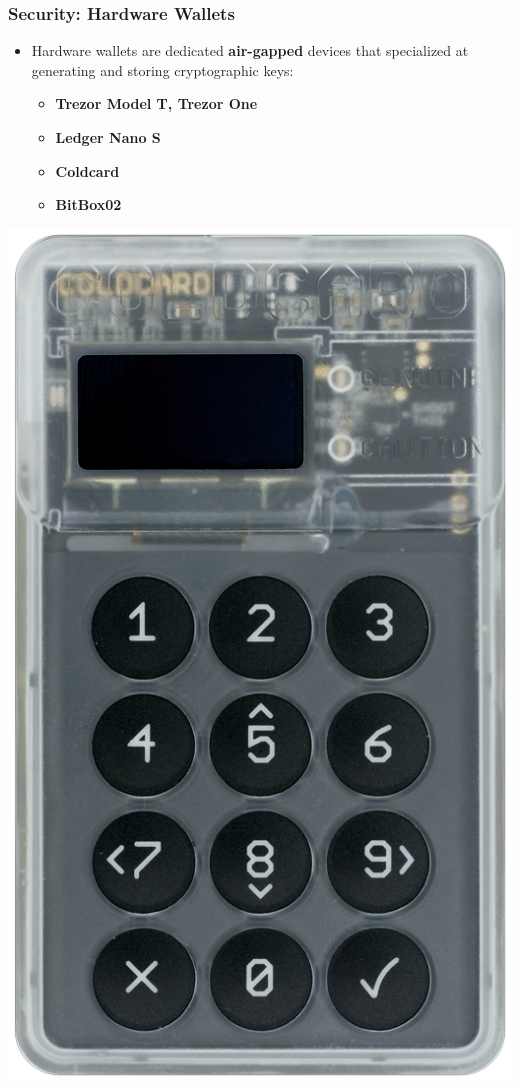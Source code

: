 \documentclass{beamer}
\begin{document}
\begin{frame}[fragile]
  \frametitle{Security: Hardware Wallets}
  \begin{minipage}{0.6\textwidth}\raggedright
    \begin{itemize}
    \item Hardware wallets are dedicated \textbf{air-gapped} devices that
      specialized at generating and storing cryptographic keys:
      \begin{itemize}
      \item \textbf{Trezor Model T, Trezor One}
      \item \textbf{Ledger Nano S}
      \item \textbf{Coldcard}
      \item \textbf{BitBox02}
      \end{itemize}
    \end{itemize}
  \end{minipage}
  \begin{minipage}{0.3\textwidth}\raggedleft
    \includegraphics[width=0.7\linewidth]{coldcard-front}
  \end{minipage}
\end{frame}
\end{document}
